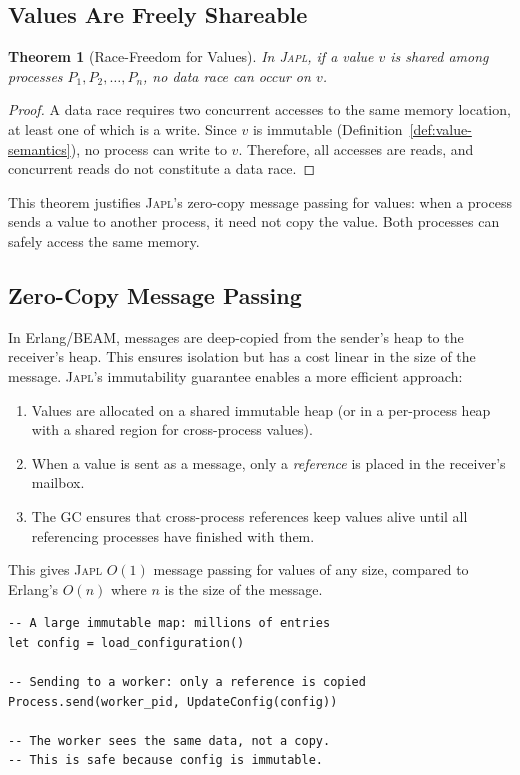 \documentclass[11pt]{article}
\newtheorem{theorem}{Theorem}[section]
\theoremstyle{definition}
\theoremstyle{remark}
\newcommand{\japl}{\textsc{Japl}}
\begin{document}
\subsection{Values Are Freely Shareable}

\begin{theorem}[Race-Freedom for Values]
\label{thm:race-freedom}
In \japl{}, if a value $v$ is shared among processes
$P_1, P_2, \ldots, P_n$, no data race can occur on $v$.
\end{theorem}

\begin{proof}
A data race requires two concurrent accesses to the same memory
location, at least one of which is a write.  Since $v$ is immutable
(Definition~\ref{def:value-semantics}), no process can write to $v$.
Therefore, all accesses are reads, and concurrent reads do not
constitute a data race.
\end{proof}

This theorem justifies \japl{}'s zero-copy message passing for values:
when a process sends a value to another process, it need not copy the
value.  Both processes can safely access the same memory.

\subsection{Zero-Copy Message Passing}
\label{sec:concurrency:zerocopy}

In Erlang/BEAM, messages are deep-copied from the sender's heap to
the receiver's heap.  This ensures isolation but has a cost linear in
the size of the message.  \japl{}'s immutability guarantee enables a
more efficient approach:

\begin{enumerate}
  \item Values are allocated on a shared immutable heap (or in a
    per-process heap with a shared region for cross-process values).
  \item When a value is sent as a message, only a \emph{reference}
    is placed in the receiver's mailbox.
  \item The GC ensures that cross-process references keep values alive
    until all referencing processes have finished with them.
\end{enumerate}

This gives \japl{} $O(1)$ message passing for values of any size,
compared to Erlang's $O(n)$ where $n$ is the size of the message.

\begin{lstlisting}[caption={Zero-copy message passing.}]
-- A large immutable map: millions of entries
let config = load_configuration()

-- Sending to a worker: only a reference is copied
Process.send(worker_pid, UpdateConfig(config))

-- The worker sees the same data, not a copy.
-- This is safe because config is immutable.
\end{lstlisting}
\end{document}
